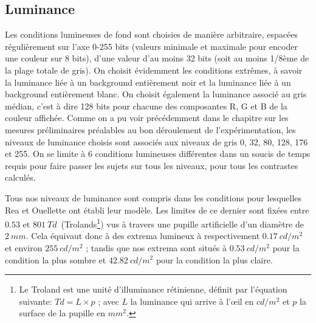 	\subsection{Luminance}
	\par Les conditions lumineuses de fond sont choisies de manière arbitraire, espacées régulièrement sur l'axe 0-255 bits (valeurs minimale et maximale pour encoder une couleur sur 8 bits), d'une valeur d'au moins 32 bits (soit au moins 1/8ème de la plage totale de gris). On choisit évidemment les conditions extrêmes, à savoir la luminance liée à un background entièrement noir et la luminance liée à un background entièrement blanc. On choisit également la luminance associé au gris médian, c'est à dire 128 bits pour chacune des composantes R, G et B de la couleur affichée. Comme on a pu voir précédemment dans le chapitre sur les mesures préliminaires préalables au bon déroulement de l'expérimentation, les niveaux de luminance choisis sont associés aux niveaux de gris 0, 32, 80, 128, 176 et 255. On se limite à 6 conditions lumineuses différentes dans un soucis de temps requis pour faire passer les sujets sur tous les niveaux, pour tous les contrastes calculés.

	\par Tous nos niveaux de luminance sont compris dans les conditions pour lesquelles Rea et Ouellette ont établi leur modèle. Les limites de ce dernier sont fixées entre $0.53$ et $801~Td$~(Trolands\footnote{Le Troland est une unité d'illuminance rétinienne, définit par l'équation suivante: $Td = L \times p$ ; avec $L$ la luminance qui arrive à l'œil en $cd/m^2$ et $p$ la surface de la pupille en $mm^2$.}) vus à travers une pupille artificielle d'un diamètre de $2~mm$. Cela équivaut donc à des extrema lumineux à respectivement $0.17~cd/m^2$ et environ $255~cd/m^2$ ; tandis que nos extrema sont situés à $0.53~cd/m^2$ pour la condition la plus sombre et $42.82~cd/m^2$ pour la condition la plus claire.
	
